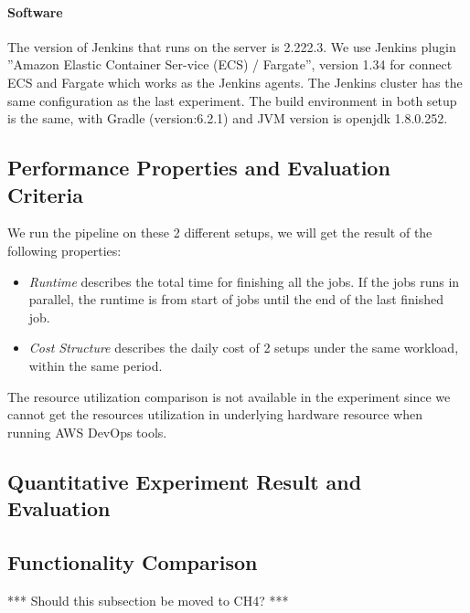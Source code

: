 \paragraph{Software}
The version of Jenkins that runs on the server is 2.222.3. We use Jenkins plugin ”Amazon Elastic Container Ser-vice (ECS) / Fargate”, version 1.34 for connect ECS and Fargate which works as the Jenkins agents. The Jenkins cluster has the same configuration as the last experiment. The build environment in both setup is the same, with Gradle (version:6.2.1) and JVM version is openjdk 1.8.0.252.
\subsection{Performance Properties and Evaluation Criteria}
We run the pipeline on these 2 different setups, we will get the result of the following properties:
\begin{itemize}
    \item \textit{Runtime} describes the total time for finishing all the jobs. If the jobs runs in parallel, the runtime is from start of jobs until the end of the last finished job.
    \item \textit{Cost Structure} describes the daily cost of 2 setups under the same workload, within the same period.
\end{itemize}
The resource utilization comparison is not available in the experiment since we cannot get the resources utilization in underlying hardware resource when running AWS DevOps tools.
\subsection{Quantitative Experiment Result and Evaluation}
\subsection{Functionality Comparison}
*** Should this subsection be moved to CH4? ***


